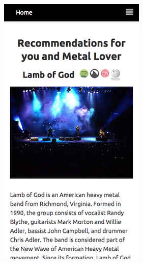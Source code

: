 \documentclass{friggeri-cv}
\begin{document}
\begin{entrylist}
{\begin{minipage}{.3\columnwidth}
  \includegraphics[width=\linewidth]{juggle_mobile-group_recommendations.png}
\end{minipage}
\vspace{1.5em}}


\end{entrylist}
\end{document}
